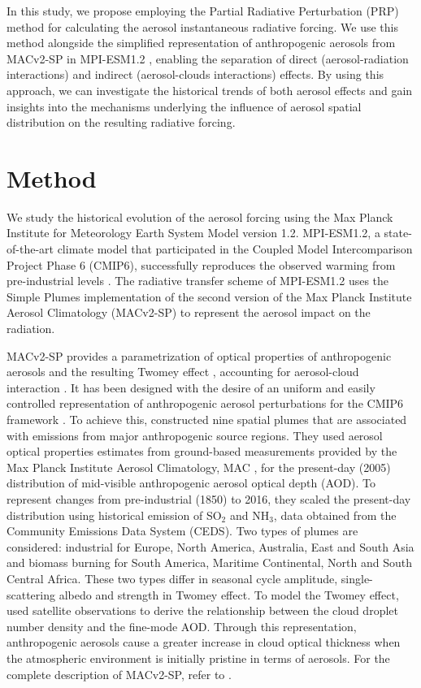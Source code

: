 \documentclass[draft]{agujournal2019}
\begin{document}
      In this study, we propose employing the Partial Radiative Perturbation (PRP) method \cite{Wetherald_1988,Colman_1997,Klocke_2013} for calculating the aerosol instantaneous radiative forcing. We use this method alongside the simplified representation of anthropogenic aerosols from MACv2-SP \cite{Stevens_2017} in MPI-ESM1.2 \cite{Mauritsen_2019}, enabling the separation of direct (aerosol-radiation interactions) and indirect (aerosol-clouds interactions) effects. By using this approach, we can investigate the historical trends of both aerosol effects and gain insights into the mechanisms underlying the influence of aerosol spatial distribution on the resulting radiative forcing.

\section{Method}\label{sec:method}
      We study the historical evolution of the aerosol forcing using the Max Planck Institute for Meteorology Earth System Model version 1.2. MPI-ESM1.2, a state-of-the-art climate model \cite{Mauritsen_2019} that participated in the Coupled Model Intercomparison Project Phase 6 (CMIP6), successfully reproduces the observed warming from pre-industrial levels \cite{Mauritsen_2020}.
      The radiative transfer scheme of MPI-ESM1.2 uses the Simple Plumes implementation of the second version of the Max Planck Institute Aerosol Climatology (MACv2-SP) to represent the aerosol impact on the radiation. 
      
      MACv2-SP provides a parametrization of optical properties of anthropogenic aerosols and the resulting Twomey effect \cite{Twomey_1974}, accounting for aerosol-cloud interaction \cite{Stevens_2017}. It has been designed with the desire of an uniform and easily controlled representation of anthropogenic aerosol perturbations for the CMIP6 framework \cite{Eyring_2016,Pincus_2016}. To achieve this,  constructed nine spatial plumes that are associated with emissions from major anthropogenic source regions. They used aerosol optical properties estimates from ground-based measurements provided by the Max Planck Institute Aerosol Climatology, MAC \cite{Kinne_2013}, for the present-day (2005) distribution of mid-visible anthropogenic aerosol optical depth (AOD). 
      To represent changes from pre-industrial (1850) to 2016, they scaled the present-day distribution using historical emission of SO$_2$ and NH$_3$, data obtained from the Community Emissions Data System (CEDS). Two types of plumes are considered: industrial for Europe, North America, Australia, East and South Asia and biomass burning for South America, Maritime Continental, North and South Central Africa. These two types differ in seasonal cycle amplitude, single-scattering albedo and strength in Twomey effect. 
      To model the Twomey effect,  used satellite observations to derive the relationship between the cloud droplet number density and the fine-mode AOD. Through this representation, anthropogenic aerosols cause a greater increase in cloud optical thickness when the atmospheric environment is initially pristine in terms of aerosols. For the complete description of MACv2-SP, refer to .
\end{document}
